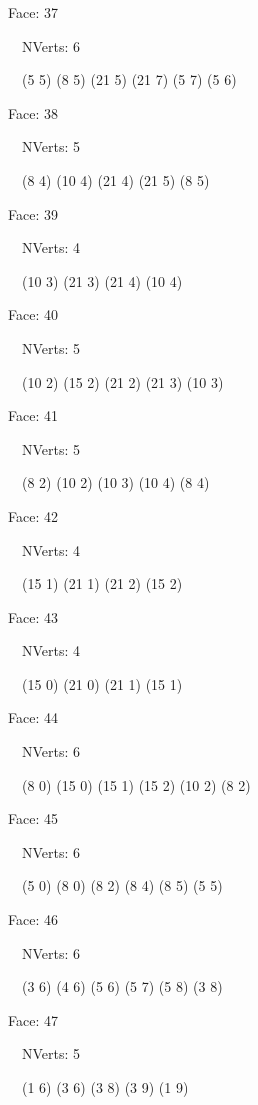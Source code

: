 \documentclass{article}
\begin{document}
{\footnotesize 

Face: 37

\   \    NVerts: 6

 \   \   (5 5) (8 5) (21 5) (21 7) (5 7) (5 6)}

{\footnotesize 

Face: 38

\   \    NVerts: 5

 \   \   (8 4) (10 4) (21 4) (21 5) (8 5)}

{\footnotesize 

Face: 39

\   \    NVerts: 4

 \   \   (10 3) (21 3) (21 4) (10 4)}

{\footnotesize 

Face: 40

\   \    NVerts: 5

 \   \   (10 2) (15 2) (21 2) (21 3) (10 3)}

{\footnotesize 

Face: 41

\   \    NVerts: 5

 \   \   (8 2) (10 2) (10 3) (10 4) (8 4)}

{\footnotesize 

Face: 42

\   \    NVerts: 4

 \   \   (15 1) (21 1) (21 2) (15 2)}

{\footnotesize 

Face: 43

\   \    NVerts: 4

 \   \   (15 0) (21 0) (21 1) (15 1)}

{\footnotesize 

Face: 44

\   \    NVerts: 6

 \   \   (8 0) (15 0) (15 1) (15 2) (10 2) (8 2)}

{\footnotesize 

Face: 45

\   \    NVerts: 6

 \   \   (5 0) (8 0) (8 2) (8 4) (8 5) (5 5)}

{\footnotesize 

Face: 46

\   \    NVerts: 6

 \   \   (3 6) (4 6) (5 6) (5 7) (5 8) (3 8)}

{\footnotesize 

Face: 47

\   \    NVerts: 5

 \   \   (1 6) (3 6) (3 8) (3 9) (1 9)}
\end{document}
